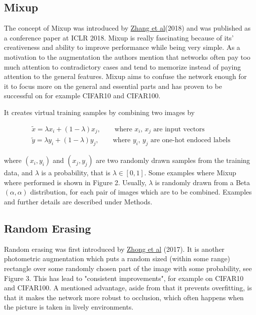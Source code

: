\documentclass{article}
\begin{document}
\subsection{Mixup}

The concept of Mixup was introduced by \href{https://arxiv.org/pdf/1710.09412.pdf}{Zhang et al}(2018) and was published as a conference paper at ICLR 2018. Mixup is really fascinating because of its' creativeness and ability to improve performance while being very simple. As a motivation to the augmentation the authors mention that networks often pay too much attention to contradictory cases and tend to memorize instead of paying attention to the general features. Mixup aims to confuse the network enough for it to focus more on the general and essential parts and has proven to be successful on for example CIFAR10 and CIFAR100.

It creates virtual training samples by combining two images by 

\begin{align*}
&\tilde{x} = \lambda x_i + (1-\lambda) x_j, \qquad \text{where $x_i$, $x_j$ are input vectors} \\
&\tilde{y} = \lambda y_i + (1-\lambda) y_j, \qquad \text{where $y_i$, $y_j$ are one-hot endoced labels}
\end{align*}


where $(x_i, y_i)$ and $(x_j, y_j)$ are two randomly drawn samples from the training data, and $\lambda$ 
is a probability, that is $\lambda \in [0,1]$. Some examples where Mixup where performed is shown in Figure 2.  Usually, $\lambda$ is randomly drawn from a Beta$(\alpha, \alpha)$ 
distribution, for each pair of images which are to be combined. Examples and further details are described under Methods. 


\subsection{Random Erasing}
Random erasing was first introduced by \href{https://arxiv.org/pdf/1708.04896.pdf}{Zhong et al} (2017). It is another photometric augmentation which puts a random sized (within some range) rectangle over some randomly chosen part of the image with some probability, see Figure 3. This has lead to "consistent improvements", for example on CIFAR10 and CIFAR100. A mentioned advantage, aside from that it prevents overfitting, is that it makes the network more robust to occlusion, which often happens when the picture is taken in lively environments.
\end{document}
